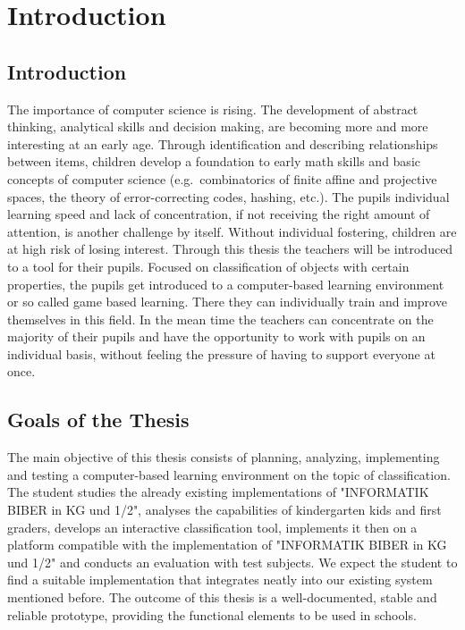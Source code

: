 
\setcounter{chapter}{0}

\chapter{Introduction}\label{ch:introduction}
\section{Introduction}\label{sec:introduction}
The importance of computer science is rising.
The development of abstract thinking, analytical skills and decision making,
are becoming more and more interesting at an early age.
Through identification and describing relationships between items,
children develop a foundation to early math skills and basic concepts of computer science
(e.g.\ combinatorics of finite affine and projective spaces, the theory of error-correcting codes, hashing, etc.)\cite{cardgameset}.
The pupils individual learning speed and lack of concentration,
if not receiving the right amount of attention, is another challenge by itself.
Without individual fostering, children are at high risk of losing interest.
Through this thesis the teachers will be introduced to a tool for their pupils.
Focused on classification of objects with certain properties, the pupils get introduced to a computer-based
learning environment or so called game based learning.
There they can individually train and improve themselves in this field.
In the mean time the teachers can concentrate on the majority of their pupils and have the opportunity to work with
pupils on an individual basis, without feeling the pressure of having to support everyone at once.

\section{Goals of the Thesis}\label{sec:goals-of-the-thesis}
The main objective of this thesis consists of planning, analyzing, implementing
and testing a computer-based learning environment on the topic of
classification. The student studies the already existing implementations of
"INFORMATIK BIBER in KG und 1/2", analyses the capabilities of kindergarten kids
and first graders, develops an interactive classification tool, implements it
then on a platform compatible with the implementation of "INFORMATIK BIBER in KG
und 1/2" and conducts an evaluation with test subjects. We expect the student to
find a suitable implementation that integrates neatly into our existing system
mentioned before. The outcome of this thesis is a well-documented, stable and
reliable prototype, providing the functional elements to be used in schools.


